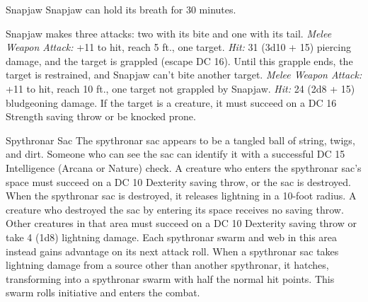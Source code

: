 \documentclass[10pt,a4paper,twoside,twocolumn,openany,bg=print,nodeprecatedcode]{dndbook}
\begin{document}
\begin{DndMonster}[float*=t]{Snapjaw}
\DndMonsterBasics[
armor-class = {17 (natural armor)},
hit-points = {\DndDice{9d12 + 27}},
speed = {30 ft., 50 ft. (key)}
]
\DndMonsterAbilityScores[
 str = 21,
 dex = 9,
 con = 17,
 int = 10,
 wis = 10,
 cha = 7
]
\DndMonsterDetails[
skills = {Stealth +5},
challenge = 5,
]
Snapjaw can hold its breath for 30 minutes.
\par
{}
Snapjaw makes three attacks: two with its bite and one with its tail.
\textsl{Melee Weapon Attack:} +11 to hit, reach 5 ft., one target. \textsl{Hit:} 31 (3d10 + 15) piercing damage, and the target is grappled (escape DC 16). Until this grapple ends, the target is restrained, and Snapjaw can't bite another target.
\textsl{Melee Weapon Attack:} +11 to hit, reach 10 ft., one target not grappled by Snapjaw. \textsl{Hit:} 24 (2d8 + 15) bludgeoning damage. If the target is a creature, it must succeed on a DC 16 Strength saving throw or be knocked prone.
\end{DndMonster}



\begin{DndMonster}[float*=t]{Spythronar Sac}
\DndMonsterBasics[
armor-class = {5},
hit-points = {\DndDice{1d4 - 1}},
speed = {0 ft.}
]
\DndMonsterAbilityScores[
 str = 1,
 dex = 1,
 con = 8,
 int = 1,
 wis = 3,
 cha = 1
]
\DndMonsterDetails[
senses = {tremorsense (blind beyond this radius), passive perception 6},
challenge = 0,
]
The spythronar sac appears to be a tangled ball of string, twigs, and dirt. Someone who can see the sac can identify it with a successful DC 15 Intelligence (Arcana or Nature) check.
A creature who enters the spythronar sac's space must succeed on a DC 10 Dexterity saving throw, or the sac is destroyed.
When the spythronar sac is destroyed, it releases lightning in a 10-foot radius. A creature who destroyed the sac by entering its space receives no saving throw. Other creatures in that area must succeed on a DC 10 Dexterity saving throw or take 4 (1d8) lightning damage. Each spythronar swarm and web in this area instead gains advantage on its next attack roll.
When a spythronar sac takes lightning damage from a source other than another spythronar, it hatches, transforming into a spythronar swarm with half the normal hit points. This swarm rolls initiative and enters the combat.
\end{DndMonster}
\end{document}
